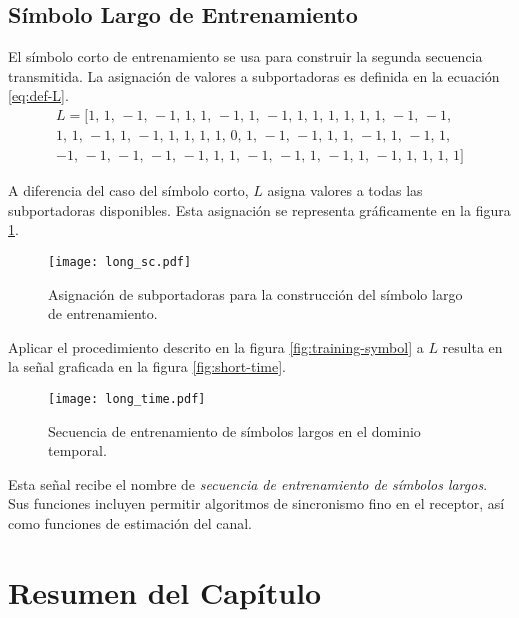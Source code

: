 \subsection{Símbolo Largo de Entrenamiento}
\label{Ss:ch2-long}

El símbolo corto de entrenamiento se usa para construir la segunda secuencia transmitida. La asignación de valores a subportadoras es definida en la ecuación \ref{eq:def-L}.\\
\begin{equation}\label{eq:def-L}
    \begin{aligned}
    L = 
    [1,\, 1,\, -1,\, -1,\, 1,\, 1,\, -1,\, 1,\, -1,\, 1,\, 1,\, 1,\, 1,\, 1,\, 1,\, -1,\, -1,\\
    1,\, 1,\, -1,\, 1,\, -1,\, 1,\, 1,\, 1,\, 1,\, 
    0,\,
    1,\, -1,\, -1,\, 1,\, 1,\, -1,\, 1,\, -1,\, 1,
    \\ -1,\, -1,\, -1,\, -1,\, -1,\, 1,\, 1,\, -1,\, -1,\, 1,\, -1,\, 1,\, -1,\, 1,\, 1,\, 1,\, 1]
    \end{aligned}
\end{equation}
    
A diferencia del caso del símbolo corto, $L$ asigna valores a todas las subportadoras disponibles. Esta asignación se representa gráficamente en la figura \ref{fig:long-sc}.\\
\begin{figure}[ht]
    \centering{}\texttt{[image: long\_sc.pdf]}
    \caption{Asignación de subportadoras para la construcción del símbolo largo de entrenamiento.\label{fig:long-sc}}  
\end{figure}

Aplicar el procedimiento descrito en la figura \ref{fig:training-symbol} a $L$ resulta en la señal graficada en la figura \ref{fig:short-time}.\\ 
\begin{figure}[ht]
    \centering{}\texttt{[image: long\_time.pdf]}
    \caption{Secuencia de entrenamiento de símbolos largos en el dominio temporal.\label{fig:long-time}}  
\end{figure}

Esta señal recibe el nombre de \textit{secuencia de entrenamiento de símbolos largos}. Sus funciones incluyen permitir algoritmos de sincronismo fino en el receptor, así como funciones de estimación del canal.

\section{Resumen del Capítulo}

